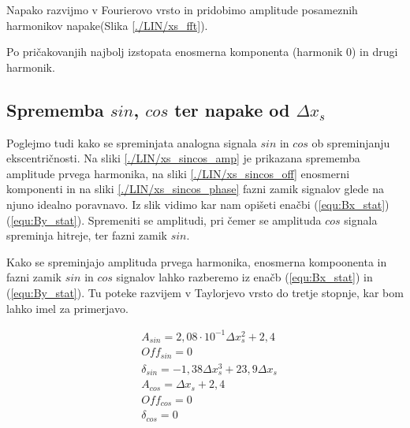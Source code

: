 
Napako razvijmo v Fourierovo vrsto in pridobimo amplitude posameznih harmonikov napake(Slika \ref{./LIN/xs_fft}).

Po pričakovanjih najbolj izstopata enosmerna komponenta (harmonik 0) in drugi harmonik.
\newpage
\subsection{Sprememba $sin$, $cos$ ter napake od $\Delta x_s$}

Poglejmo tudi kako se spreminjata analogna signala $sin$ in $cos$ ob spreminjanju ekscentričnosti. Na sliki \ref{./LIN/xs_sincos_amp} je prikazana sprememba amplitude prvega harmonika, na sliki \ref{./LIN/xs_sincos_off} enosmerni komponenti in na sliki \ref{./LIN/xs_sincos_phase} fazni zamik signalov glede na njuno idealno poravnavo. Iz slik vidimo kar nam opišeti enačbi (\ref{equ:Bx_stat})(\ref{equ:By_stat}). Spremeniti se amplitudi, pri čemer se amplituda $cos$ signala spreminja hitreje, ter fazni zamik $sin$.



Kako se spreminjajo amplituda prvega harmonika, enosmerna kompoonenta in fazni zamik $sin$ in $cos$ signalov lahko razberemo iz enačb (\ref{equ:Bx_stat}) in (\ref{equ:By_stat}). Tu poteke razvijem v Taylorjevo vrsto do tretje stopnje, kar bom lahko imel za primerjavo.

\begin{eqnarray}
\label{analog_lin_xs}
&A_{sin} = 2,08 \cdot 10^{-1} \Delta x_s^2+2,4\\
&Off_{sin} = 0 \\
&\delta_{sin} =-1,38 \Delta x_s^3+ 23,9 \Delta x_s  \\
&A_{cos} = \Delta x_s+2,4\\
&Off_{cos} = 0 \\
&\delta_{cos} = 0
\end{eqnarray}

